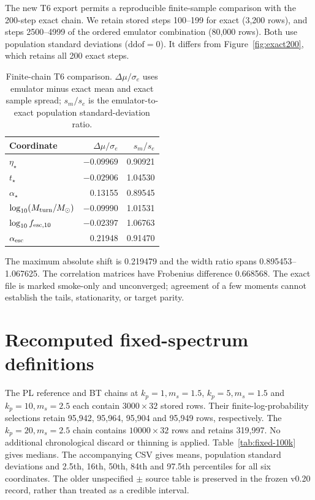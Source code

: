 The new T6 export permits a reproducible finite-sample comparison with the 200-step exact chain. We retain stored steps 100--199 for exact (3,200 rows), and steps 2500--4999 of the ordered emulator combination (80,000 rows). Both use population standard deviations ($\mathrm{ddof}=0$). It differs from Figure~\ref{fig:exact200}, which retains all 200 exact steps.

\begin{table}[t]\centering\small
\caption{Finite-chain T6 comparison. $\Delta\mu/\sigma_e$ uses emulator minus exact mean and exact sample spread; $s_m/s_e$ is the emulator-to-exact population standard-deviation ratio.}\label{tab:t6}
\begin{tabular}{lrr}\toprule
Coordinate & $\Delta\mu/\sigma_e$ & $s_m/s_e$\\\midrule
$\eta_\star$ & $-0.09969$ & 0.90921\\
$t_\star$ & $-0.02906$ & 1.04530\\
$\alpha_\star$ & 0.13155 & 0.89545\\
$\log_{10}(M_{\rm turn}/M_\odot)$ & $-0.09990$ & 1.01531\\
$\log_{10}f_{{\rm esc},10}$ & $-0.02397$ & 1.06763\\
$\alpha_{\rm esc}$ & 0.21948 & 0.91470\\\bottomrule
\end{tabular}\end{table}

The maximum absolute shift is 0.219479 and the width ratio spans 0.895453--1.067625. The correlation matrices have Frobenius difference 0.668568. The exact file is marked smoke-only and unconverged; agreement of a few moments cannot establish the tails, stationarity, or target parity.

\section{Recomputed fixed-spectrum definitions}\label{app:recomputed-fixed}

The PL reference and BT chains at $k_p=1,m_s=1.5$, $k_p=5,m_s=1.5$ and $k_p=10,m_s=2.5$ each contain $3000\times32$ stored rows. Their finite-log-probability selections retain 95,942, 95,964, 95,904 and 95,949 rows, respectively. The $k_p=20,m_s=2.5$ chain contains $10000\times32$ rows and retains 319,997. No additional chronological discard or thinning is applied. Table~\ref{tab:fixed-100k} gives medians. The accompanying CSV gives means, population standard deviations and 2.5th, 16th, 50th, 84th and 97.5th percentiles for all six coordinates. The older unspecified $\pm$ source table is preserved in the frozen v0.20 record, rather than treated as a credible interval.


